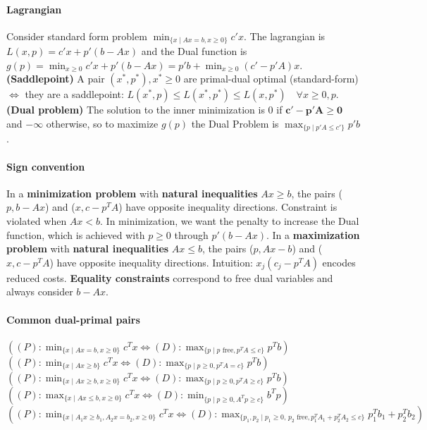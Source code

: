 \documentclass{article}
\begin{document}
\paragraph{Lagrangian} Consider standard form problem $\min_{\{x \mid Ax = b, x \geq 0\}} c'x$. The lagrangian is $L(x,p) = c'x + p'(b - Ax)$ and the Dual function is $g(p) = \min_{x\geq 0} c'x + p'(b-Ax) = p'b + \min_{x\geq 0} (c' - p'A)x$. \textbf{(Saddlepoint)} A pair $(x^*, p^*), x^*\geq 0$ are primal-dual optimal (standard-form) $\iff$ they are a saddlepoint: $L(x^*, p) \leq L(x^*, p^*) \leq L(x, p^*) \quad \forall x\geq 0, p$. \textbf{(Dual problem)} The solution to the inner minimization is 0 if $\mathbf{c' - p'A \geq 0}$ and $-\infty$ otherwise, so to maximize $g(p)$ the Dual Problem is $\max_{\{p \mid p'A\leq c'\}}p'b$. 


\paragraph{Sign convention}
In a \textbf{minimization problem} with \textbf{natural inequalities} $Ax \geq b$, the pairs ($p, b-Ax$) and ($x, c-p^TA$) have opposite inequality directions. Constraint is violated when $Ax < b$. In minimization, we want the penalty to increase the Dual function, which is achieved with $p\geq 0$ through $p'(b - Ax)$. In a \textbf{maximization problem} with \textbf{natural inequalities} $Ax \leq b$, the pairs ($p, Ax-b$) and ($x, c-p^TA$) have opposite inequality directions. Intuition: $x_j(c_j - p^TA)$ encodes reduced costs. \textbf{Equality constraints} correspond to free dual variables and always consider $b - Ax$. 


\paragraph{Common dual-primal pairs}
$\left((P):\min_{\{x \mid Ax = b, x\geq 0\}}c^Tx \iff (D):\max_{\{p \mid p\text{ free}, p^TA \leq c\}}p^Tb\right)$
\newline\noindent$\left((P):\min_{\{x \mid Ax \geq b\}}c^Tx \iff
    (D):\max_{\{p\mid p\geq 0, p^TA = c\}}p^Tb\right)$
\newline\noindent$\left((P):\min_{\{x \mid Ax \geq b, x\geq 0\}}c^Tx \iff
    (D):\max_{\{p\mid p\geq 0, p^TA \geq c\}}p^Tb\right)$
\newline\noindent$\left((P):\max_{\{x \mid Ax \leq b, x\geq 0\}}c^Tx \iff
    (D):\min_{\{p\mid p\geq 0, A^Tp \geq c\}}b^Tp\right)$
\newline\noindent$\left((P):\min_{\{x \mid A_1x \geq b_1, A_2x = b_2, x\geq 0\}}c^Tx \iff
    (D):\max_{\{p_1, p_2\mid p_1\geq 0,\,p_2\text{ free}, p_1^TA_1 + p_2^TA_2 \leq c\}}p_1^Tb_1 + p_2^Tb_2\right)$
\end{document}
